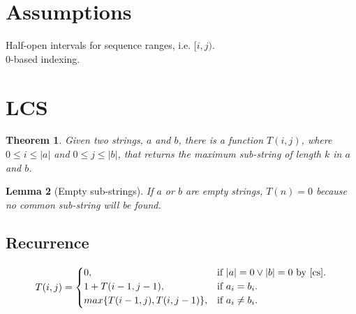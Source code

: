 \documentclass{article}
\newtheorem{theorem}{Theorem}[section]
\newtheorem{lemma}[theorem]{Lemma}
\begin{document}
	\section{Assumptions}
	Half-open intervals for sequence ranges, i.e. $[i,j)$.\\
	0-based indexing.
	
	\section{LCS}
	\begin{theorem}
	Given two strings, $a$ and $b$, there is a function $T(i, j)$, where $0 \leq i \leq |a|$ and $0 \leq j \leq |b|$, that returns the 
	maximum sub-string of length $k$ in $a$ and $b$.
	\end{theorem}
	
	\begin{lemma} [Empty sub-strings]
	\label{cs}	
	If $a$ or $b$ are empty strings, $T(n)=0$ because no common sub-string will be found.
	\end{lemma}
	
	\subsection{Recurrence}
    	\begin{equation}
	T(i, j)=			
	\begin{cases}
	0, & \text{if $|a|=0 \vee |b|=0$ by \ref{cs}}.\\
	1 + T(i-1,j-1), & \text{if $a_i = b_i$}.\\	
	\underset{}{max}\{T(i-1,j), T(i,j-1)\}, & \text{if $a_i \neq b_i$}.\\					
	\end{cases}
	\end{equation}
\end{document}
